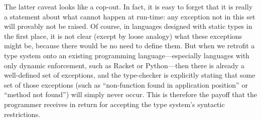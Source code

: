 The latter caveat looks like a cop-out. In fact, it is easy to forget that it is
really a statement about what cannot happen at run-time: any exception not in
this set will provably not be raised. Of course, in languages designed with
static types in the first place, it is not clear (except by loose analogy) what
these exceptions might be, because there would be no need to define them. But
when we retrofit a type system onto an existing programming language—especially
languages with only dynamic enforcement, such as Racket or Python—then there is
already a well-defined set of exceptions, and the type-checker is explicitly
stating that some set of those exceptions (such as “non-function found in
application position” or “method not found”) will simply never occur. This is
therefore the payoff that the programmer receives in return for accepting the
type system’s syntactic restrictions.
